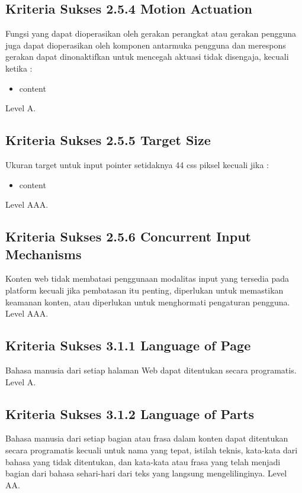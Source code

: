 \subsection{Kriteria Sukses 2.5.4 Motion Actuation}
\label{sec:kriteria_2.5.4}
Fungsi yang dapat dioperasikan oleh gerakan perangkat atau gerakan pengguna juga dapat dioperasikan oleh komponen antarmuka pengguna dan merespons gerakan dapat dinonaktifkan untuk mencegah aktuasi tidak disengaja, kecuali ketika :

\begin{itemize}
	\item content
\end{itemize}

Level A.

\subsection{Kriteria Sukses 2.5.5 Target Size}
\label{sec:kriteria_2.5.5}
Ukuran target untuk input pointer setidaknya 44 css piksel kecuali jika :

\begin{itemize}
	\item content
\end{itemize}

Level AAA.

\subsection{Kriteria Sukses 2.5.6 Concurrent Input Mechanisms}
\label{sec:kriteria_2.5.6}
Konten web tidak membatasi penggunaan modalitas input yang tersedia pada platform kecuali jika pembatasan itu penting, diperlukan untuk memastikan keamanan konten, atau diperlukan untuk menghormati pengaturan pengguna.
Level AAA.

\subsection{Kriteria Sukses 3.1.1 Language of Page}
\label{sec:kriteria_3.1.1}
Bahasa manusia dari setiap halaman Web dapat ditentukan secara programatis.
Level A.

\subsection{Kriteria Sukses 3.1.2 Language of Parts}
\label{sec:kriteria_3.1.2}
Bahasa manusia dari setiap bagian atau frasa dalam konten dapat ditentukan secara programatis kecuali untuk nama yang tepat, istilah teknis, kata-kata dari bahasa yang tidak ditentukan, dan kata-kata atau frasa yang telah menjadi bagian dari bahasa sehari-hari dari teks yang langsung mengelilinginya.
Level AA.

